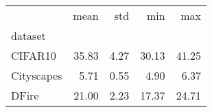 \begin{tabular}{lrrrr}
\toprule
 & mean & std & min & max \\
dataset &  &  &  &  \\
\midrule
CIFAR10 & 35.83 & 4.27 & 30.13 & 41.25 \\
Cityscapes & 5.71 & 0.55 & 4.90 & 6.37 \\
DFire & 21.00 & 2.23 & 17.37 & 24.71 \\
\bottomrule
\end{tabular}
